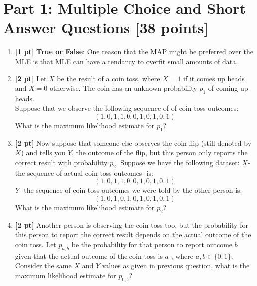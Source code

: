 \documentclass{article}
\begin{document}
\section*{Part 1: Multiple Choice and Short Answer Questions [38 points]} 
\begin{enumerate}
    \item \textbf{[1 pt]} \textbf{True or False}: One reason that the MAP might be preferred over the MLE is that MLE can have a tendancy to overfit small amounts of data.
    
    \begin{tcolorbox}[width=\linewidth/3,height=1.5cm]
    \end{tcolorbox}
    
    \item \textbf{[2 pt]} Let $X$ be the result of a coin toss, where $X=1$ if it comes up heads and $X=0$ otherwise.  The coin has an unknown probability $p_1$ of coming up heads.
    \\ Suppose that we observe the following sequence of of coin toss outcomes:
    $$
    (1,0,1,1,0,0,1,0,1,0,1)
    $$
    What is the maximum likelihood estimate for $p_1$?
    \begin{tcolorbox}[width=\linewidth/3,height=1.5cm]
    \end{tcolorbox}
    
    \item \textbf{[2 pt]} Now suppose that someone else observes the coin flip (still denoted by $X$) and tells you $Y$, the outcome of the flip, but this person only reports the correct result with probability $p_2$.  Suppose we have the following dataset:
    $X$-the sequence of actual coin toss outcomes- is: \\
    $$
    (1,0,1,1,0,0,1,0,1,0,1)
    $$
    $Y$- the sequence of coin toss outcomes we were told by the other person-is:\\
    $$
    (1,0,1,0,1,0,1,0,1,0,1)
    $$
    What is the maximum likelihood estimate for $p_2$?
    
    \begin{tcolorbox}[width=\linewidth/3,height=1.5cm]
    \end{tcolorbox}
    
    \item \textbf{[2 pt]} Another person is observing the coin toss too, but the probability for this person to report the correct result depends on the actual outcome of the coin toss. Let  $p_{a,b}$ be the probability for that person to report outcome $b$ given that the actual outcome of the coin toss is $a$ , where  $a,b\in\{0,1\}$. Consider the same  $X$  and  $Y$  values as given in previous question, what is the maximum likelihood estimate for  $p_{0,0}$?
    \begin{tcolorbox}[width=\linewidth/3,height=1.5cm]
    \end{tcolorbox}
    

\end{enumerate}
\end{document}
